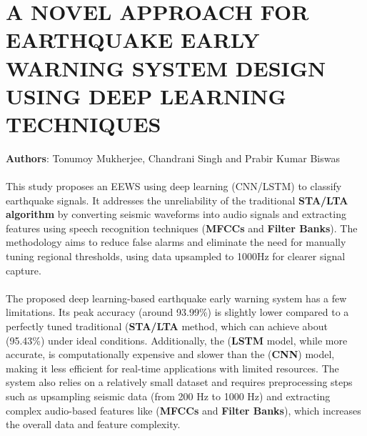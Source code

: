 \documentclass[a4paper,12pt]{report}
\begin{document}
\section{A NOVEL APPROACH FOR EARTHQUAKE EARLY WARNING SYSTEM DESIGN USING DEEP LEARNING TECHNIQUES}
\label{sec:2.1}
\textbf{Authors}: Tonumoy Mukherjee, Chandrani Singh and Prabir Kumar Biswas\\
\\
This study proposes an EEWS using deep learning (CNN/LSTM) to classify earthquake signals. It addresses the unreliability of the traditional \textbf{STA/LTA algorithm} by converting seismic waveforms into audio signals and extracting features using speech recognition techniques (\textbf{MFCCs} and \textbf{Filter Banks}). The methodology aims to reduce false alarms and eliminate the need for manually tuning regional thresholds, using data upsampled to 1000Hz for clearer signal capture.
\\
\\
The proposed deep learning-based earthquake early warning system has a few limitations. Its peak accuracy (around 93.99\%) is slightly lower compared to a perfectly tuned traditional (\textbf{STA/LTA} method, which can achieve about (95.43\%) under ideal conditions. Additionally, the (\textbf{LSTM} model, while more accurate, is computationally expensive and slower than the (\textbf{CNN}) model, making it less efficient for real-time applications with limited resources. The system also relies on a relatively small dataset and requires preprocessing steps such as upsampling seismic data (from 200 Hz to 1000 Hz) and extracting complex audio-based features like (\textbf{MFCCs} and \textbf{Filter Banks}), which increases the overall data and feature complexity.    
\end{document}
